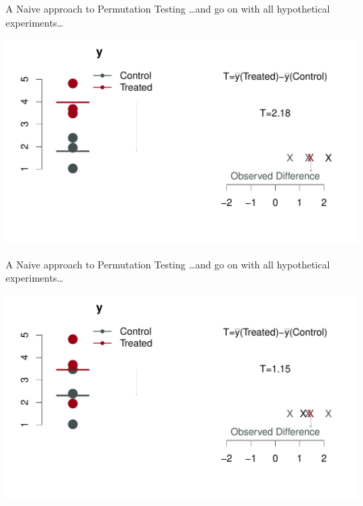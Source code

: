 \begin{frame}{A Naive approach to Permutation Testing} 
\ldots and go on with all hypothetical experiments\ldots
\begin{center}
\includegraphics[width=1.1\textwidth]{figures/permsslides4} 
\end{center}
\end{frame}



\begin{frame}{A Naive approach to Permutation Testing} 
\ldots and go on with all hypothetical experiments\ldots
\begin{center}
\includegraphics[width=1.1\textwidth]{figures/permsslides5} 
\end{center}
\end{frame}


